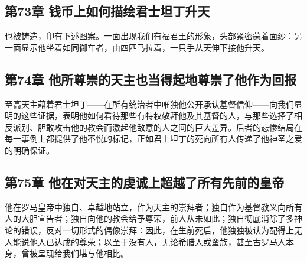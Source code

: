 
\subsection{第73章 钱币上如何描绘君士坦丁升天}

也被铸造，印有下述图案。一面出现我们有福君王的形象，头部紧密蒙着面纱：另一面显示他坐着如同御车者，由四匹马拉着，一只手从天伸下接他升天。\par


\subsection{第74章 他所尊崇的天主也当得起地尊崇了他作为回报}

至高天主藉着君士坦丁——在所有统治者中唯独他公开承认基督信仰——向我们显明的这些证据，表明他如何看待那些有特权敬拜他及其基督的人，与那些选择了相反派别、胆敢攻击他的教会而激起他敌意的人之间的巨大差异。后者的悲惨结局在每一事例上都提供了他不悦的标记，正如君士坦丁的死向所有人传递了他神圣之爱的明确保证。\par


\subsection{第75章 他在对天主的虔诚上超越了所有先前的皇帝}

他在罗马皇帝中独自、卓越地站立，作为天主的崇拜者；独自作为基督教义向所有人的大胆宣告者；独自向他的教会给予尊荣，前人从未如此；独自彻底消除了多神论的错误，反对一切形式的偶像崇拜：因此，在生前死后，他独独被认为配得上无人能说他人已达成的尊荣；以至于没有人，无论希腊人或蛮族，甚至古罗马人本身，曾被呈现给我们堪与他相比。\par

